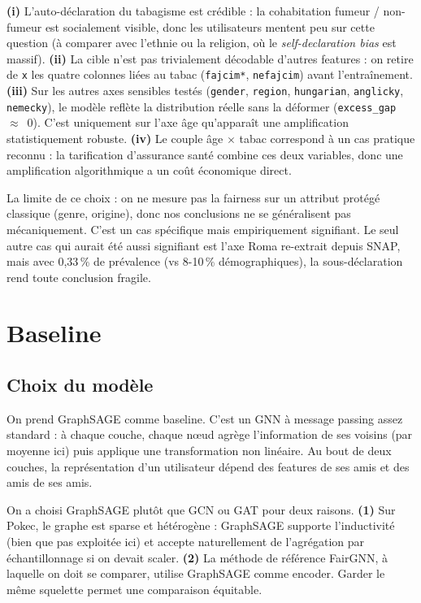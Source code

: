 \documentclass[10pt,a4paper,twocolumn]{article}
\begin{document}
\textbf{(i)} L'auto-déclaration du tabagisme est crédible : la cohabitation fumeur / non-fumeur est socialement visible, donc les utilisateurs mentent peu sur cette question (à comparer avec l'ethnie ou la religion, où le \emph{self-declaration bias} est massif).
\textbf{(ii)} La cible n'est pas trivialement décodable d'autres features : on retire de \texttt{x} les quatre colonnes liées au tabac (\texttt{fajcim*}, \texttt{nefajcim}) avant l'entraînement.
\textbf{(iii)} Sur les autres axes sensibles testés (\texttt{gender}, \texttt{region}, \texttt{hungarian}, \texttt{anglicky}, \texttt{nemecky}), le modèle reflète la distribution réelle sans la déformer (\texttt{excess\_gap}~$\approx$~0). C'est uniquement sur l'axe âge qu'apparaît une amplification statistiquement robuste.
\textbf{(iv)} Le couple âge $\times$ tabac correspond à un cas pratique reconnu : la tarification d'assurance santé combine ces deux variables, donc une amplification algorithmique a un coût économique direct.

\vspace*{0.15cm}
La limite de ce choix : on ne mesure pas la fairness sur un attribut protégé classique (genre, origine), donc nos conclusions ne se généralisent pas mécaniquement. C'est un cas spécifique mais empiriquement signifiant. Le seul autre cas qui aurait été aussi signifiant est l'axe Roma re-extrait depuis SNAP, mais avec 0{,}33\,\% de prévalence (vs 8-10\,\% démographiques), la sous-déclaration rend toute conclusion fragile.

\section{Baseline}

\subsection{Choix du modèle}

On prend GraphSAGE comme baseline. C'est un GNN à message passing assez standard : à chaque couche, chaque nœud agrège l'information de ses voisins (par moyenne ici) puis applique une transformation non linéaire. Au bout de deux couches, la représentation d'un utilisateur dépend des features de ses amis et des amis de ses amis.

On a choisi GraphSAGE plutôt que GCN ou GAT pour deux raisons. \textbf{(1)} Sur Pokec, le graphe est sparse et hétérogène : GraphSAGE supporte l'inductivité (bien que pas exploitée ici) et accepte naturellement de l'agrégation par échantillonnage si on devait scaler. \textbf{(2)} La méthode de référence FairGNN, à laquelle on doit se comparer, utilise GraphSAGE comme encoder. Garder le même squelette permet une comparaison équitable.
\end{document}

